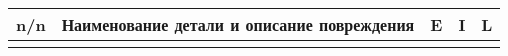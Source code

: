 \begin{longtable}{G{3mm}|M{130mm}|G{5mm}|G{5mm}|G{5mm}}
     \hline %
    \hline
    \toprule 
    \bf  {\footnotesize  n/n}  &\bf {\small Наименование  детали и описание повреждения} & \bf {\small E} & \bf {\small I}& \bf {\small L}\\\hline\hline   \toprule  \endhead 
   

  \end{longtable}